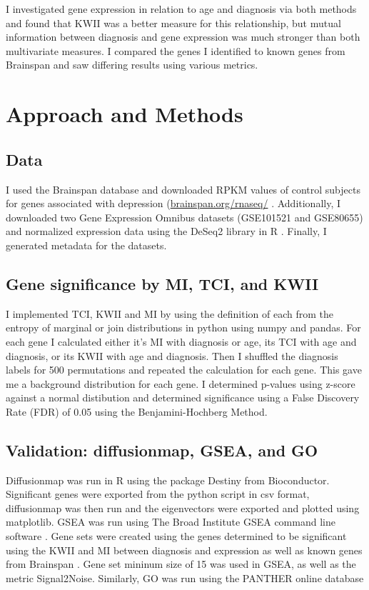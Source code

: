 \documentclass{bioinfo}
\begin{document}
I investigated gene expression in relation to age and diagnosis via both methods and found that KWII was a better measure for this relationship, but mutual information between diagnosis and gene expression was much stronger than both multivariate measures.  I compared the genes I identified to known genes from Brainspan and saw differing results using various metrics.

\section{Approach and Methods}

\subsection{Data}
I used the Brainspan database and downloaded RPKM values of control subjects for genes associated with depression (\href{http://www.brainspan.org/rnaseq/}{brainspan.org/rnaseq/} \citep{Brainspan}.  Additionally, I downloaded two Gene Expression Omnibus datasets (GSE101521 and GSE80655) and normalized
expression data using the DeSeq2 library in R \citep{Love}.  Finally, I generated metadata for the datasets.

\subsection{Gene significance by MI, TCI, and KWII}
I implemented TCI, KWII and MI by using the definition of each from the entropy of marginal or join distributions in python using numpy and pandas.  For each gene I calculated either it's MI with diagnosis or age, its TCI with age and diagnosis, or its KWII with age and diagnosis.  Then I shuffled the diagnosis labels for 500 permutations and repeated the calculation for each gene.  This gave me a background distribution for each gene.  I determined p-values using z-score against a normal
distibution and determined significance using a False Discovery Rate (FDR) of 0.05 using the Benjamini-Hochberg Method.

\subsection{Validation: diffusionmap, GSEA, and GO}
Diffusionmap was run in R using the package Destiny from Bioconductor.  Significant genes were exported from the python script in csv format, diffusionmap was then run and the eigenvectors were exported and plotted using matplotlib.  GSEA was run using The Broad Institute GSEA command line software \citep{Subramanian}.  Gene sets were created using the genes determined to be significant using the KWII and MI between diagnosis and expression as well as known genes from Brainspan
\citep{Brainspan}.  Gene set mininum size of 15 was used in GSEA, as well as the metric Signal2Noise.    Similarly, GO was run using the PANTHER online database \citep{GO}
\end{document}
